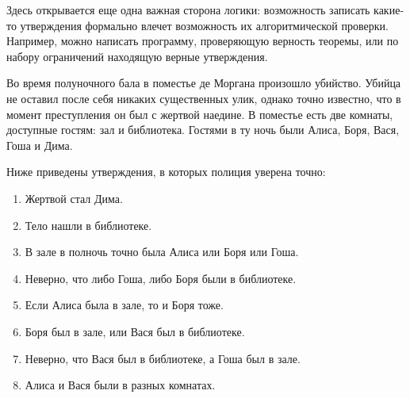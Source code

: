 Здесь открывается еще одна важная сторона логики: возможность записать какие-то утверждения формально влечет возможность их алгоритмической проверки.
Например, можно написать программу, проверяющую верность теоремы, или по набору ограничений находящую верные утверждения.

\begin{Exercise}[counter=SecExercise, label={ex:boolean:investigation}]
    \noindent
    Во время полуночного бала в поместье де Моргана произошло убийство.
    Убийца не оставил после себя никаких существенных улик, однако точно известно, что в момент преступления он был с жертвой наедине.
    В поместье есть две комнаты, доступные гостям: зал и библиотека.
    Гостями в ту ночь были Алиса, Боря, Вася, Гоша и Дима.

    Ниже приведены утверждения, в которых полиция уверена точно:
    \begin{enumerate}
        \item Жертвой стал Дима.
        \item Тело нашли в библиотеке.
        \item В зале в полночь точно была Алиса или Боря или Гоша.
        \item Неверно, что либо Гоша, либо Боря были в библиотеке.
        \item Если Алиса была в зале, то и Боря тоже.
        \item Боря был в зале, или Вася был в библиотеке.
        \item Неверно, что Вася был в библиотеке, а Гоша был в зале.
        \item Алиса и Вася были в разных комнатах.
    \end{enumerate}
\end{Exercise}


